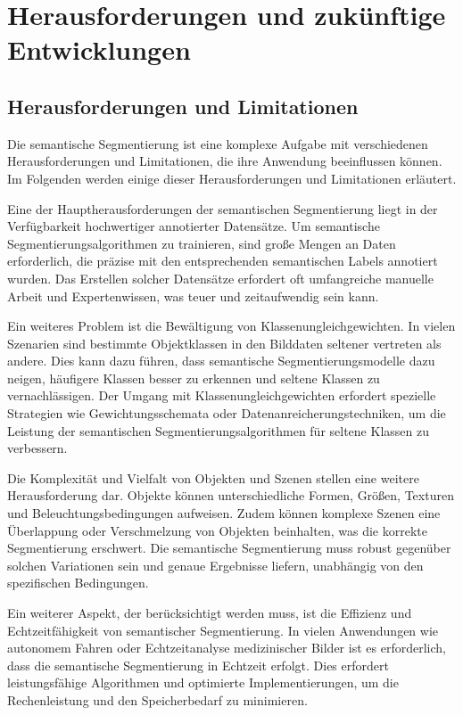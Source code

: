 \chapter{Herausforderungen und zukünftige Entwicklungen}
\section{Herausforderungen und Limitationen}
Die semantische Segmentierung ist eine komplexe Aufgabe mit verschiedenen
Herausforderungen und Limitationen, die ihre Anwendung beeinflussen können. Im
Folgenden werden einige dieser Herausforderungen und Limitationen erläutert.

Eine der Hauptherausforderungen der semantischen Segmentierung liegt in der
Verfügbarkeit hochwertiger annotierter Datensätze. Um semantische
Segmentierungsalgorithmen zu trainieren, sind große Mengen an Daten
erforderlich, die präzise mit den entsprechenden semantischen Labels annotiert
wurden. Das Erstellen solcher Datensätze erfordert oft umfangreiche manuelle
Arbeit und Expertenwissen, was teuer und zeitaufwendig sein kann.

Ein weiteres Problem ist die Bewältigung von Klassenungleichgewichten. In
vielen Szenarien sind bestimmte Objektklassen in den Bilddaten seltener
vertreten als andere. Dies kann dazu führen, dass semantische
Segmentierungsmodelle dazu neigen, häufigere Klassen besser zu erkennen und
seltene Klassen zu vernachlässigen. Der Umgang mit Klassenungleichgewichten
erfordert spezielle Strategien wie Gewichtungsschemata oder
Datenanreicherungstechniken, um die Leistung der semantischen
Segmentierungsalgorithmen für seltene Klassen zu verbessern.

Die Komplexität und Vielfalt von Objekten und Szenen stellen eine weitere
Herausforderung dar. Objekte können unterschiedliche Formen, Größen, Texturen
und Beleuchtungsbedingungen aufweisen. Zudem können komplexe Szenen eine
Überlappung oder Verschmelzung von Objekten beinhalten, was die korrekte
Segmentierung erschwert. Die semantische Segmentierung muss robust gegenüber
solchen Variationen sein und genaue Ergebnisse liefern, unabhängig von den
spezifischen Bedingungen.

Ein weiterer Aspekt, der berücksichtigt werden muss, ist die Effizienz und
Echtzeitfähigkeit von semantischer Segmentierung. In vielen Anwendungen wie
autonomem Fahren oder Echtzeitanalyse medizinischer Bilder ist es erforderlich,
dass die semantische Segmentierung in Echtzeit erfolgt. Dies erfordert
leistungsfähige Algorithmen und optimierte Implementierungen, um die
Rechenleistung und den Speicherbedarf zu minimieren.

